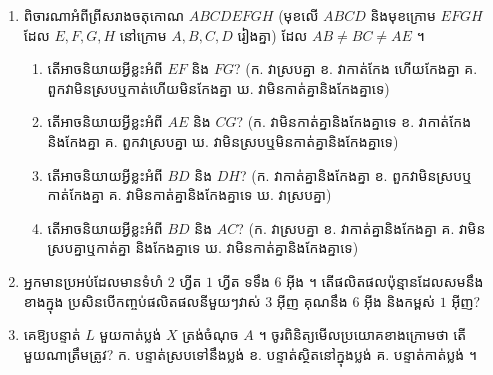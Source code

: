 \begin{enumerate}[1]
  \item ពិចារណាអំពីព្រីសរាងចតុកោណ $ABCDEFGH$ (មុខលើ $ABCD$ និងមុខក្រោម $EFGH$ ដែល $E, F, G, H$ នៅក្រោម $A, B, C, D$ រៀងគ្នា) ដែល $AB \ne BC \ne AE$ ។
  \begin{enumerate}[a]
    \item តើអាចនិយាយអ្វីខ្លះអំពី $EF$ និង $FG$? (ក. វាស្របគ្នា \quad ខ. វាកាត់កែង ហើយកែងគ្នា \quad គ. ពួកវាមិនស្របឬកាត់ហើយមិនកែងគ្នា \quad ឃ. វាមិនកាត់គ្នានិងកែងគ្នាទេ)
    \item តើអាចនិយាយអ្វីខ្លះអំពី $AE$ និង $CG$? (ក. វាមិនកាត់គ្នានិងកែងគ្នាទេ \quad ខ. វាកាត់កែងនិងកែងគ្នា \quad គ. ពួកវាស្របគ្នា \quad ឃ. វាមិនស្របឬមិនកាត់គ្នានិងកែងគ្នាទេ)
    \item តើអាចនិយាយអ្វីខ្លះអំពី $BD$ និង $DH$? (ក. វាកាត់គ្នានិងកែងគ្នា \quad ខ. ពួកវាមិនស្របឬកាត់កែងគ្នា \quad គ. វាមិនកាត់គ្នានិងកែងគ្នាទេ \quad ឃ. វាស្របគ្នា)
    \item តើអាចនិយាយអ្វីខ្លះអំពី $BD$ និង $AC$? (ក. វាស្របគ្នា \quad ខ. វាកាត់គ្នានិងកែងគ្នា \quad គ. វាមិនស្របគ្នាឬកាត់គ្នា និងកែងគ្នាទេ \quad ឃ. វាមិនកាត់គ្នានិងកែងគ្នាទេ)
  \end{enumerate}
  \item អ្នកមានប្រអប់ដែលមានទំហំ $2$ ហ្វីត $1$ ហ្វីត ទទឹង $6$ អ៊ីង ។ តើផលិតផលប៉ុន្មានដែលសមនឹងខាងក្នុង ប្រសិនបើកញ្ចប់ផលិតផលនីមួយៗវាស់ $3$ អ៊ីញ គុណនឹង $6$ អ៊ីង និងកម្ពស់ $1$ អ៊ីញ?
  \item គេឱ្យបន្ទាត់ $L$ មួយកាត់ប្លង់ $X$ ត្រង់ចំណុច $A$ ។ ចូរពិនិត្យមើលប្រយោគខាងក្រោមថា តើមួយណាត្រឹមត្រូវ? \quad ក. បន្ទាត់ស្របទៅនឹងប្លង់ \quad ខ. បន្ទាត់ស្ថិតនៅក្នុងប្លង់ \quad គ. បន្ទាត់កាត់ប្លង់ ។
\end{enumerate}

